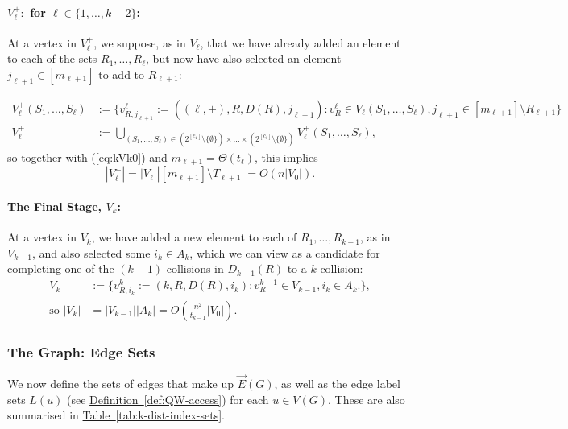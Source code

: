 \documentclass{theoretics}
\newcommand{\eq}[1]{\hyperref[eq:#1]{(\ref*{eq:#1})}}
\newcommand{\tabl}[1]{\hyperref[tab:#1]{Table~\ref*{tab:#1}}}
\newcommand{\defin}[1]{\hyperref[def:#1]{Definition~\ref*{def:#1}}}
\renewcommand{\>}{\rangle}
\newcommand{\<}{\langle}
\renewcommand{\(}{\left(}
\renewcommand{\)}{\right)}
\def\abs#1{\left| #1 \right|}
\begin{document}
\paragraph{$V_{\ell}^+:$ for $\ell\in\{1,\dots,k-2\}$:} At a vertex in $V_{\ell}^+$, we suppose, as in $V_{\ell}$, that we have already added an element to each of the sets $R_1,\dots,R_{\ell}$, but now have also selected an element $j_{\ell+1}\in [m_{\ell+1}]$ to add to $R_{\ell+1}$:

\begin{align*}
	V_{\ell}^+(S_1,\dots,S_{\ell})&:=\Big\{v^{\ell}_{R,j_{\ell+1}}:=((\ell,+),R,D(R),j_{\ell+1}): 
	 v^{\ell}_{R} \in V_{\ell}(S_1,\dots,S_{\ell}), j_{\ell+1}\in [m_{\ell+1}]\setminus R_{\ell+1}\Big\}\\
V_{\ell}^+ &:= \bigcup_{(S_1,\dots,S_{\ell})\in (2^{[c_1]}\setminus\{\emptyset\})\times\dots\times(2^{[c_\ell]}\setminus\{\emptyset\})} V_{\ell}^+(S_1,\dots,S_{\ell}),
\end{align*}
\noindent so together with \eq{kVk0} and $m_{\ell+1}=\Theta(t_{\ell})$, this implies
\begin{equation}
	\abs{V_{\ell}^+} = \abs{V_{\ell}}\abs{[m_{\ell+1}]\setminus T_{\ell+1}} = O\left(n\abs{V_0}\right).\label{eq:kVk1}
\end{equation}


\paragraph{The Final Stage, $V_k$:} At a vertex in $V_k$, we have added a new element to each of $R_1,\dots,R_{k-1}$, as in $V_{k-1}$, and also selected some $i_k\in A_k$, which we can view as a candidate for completing one of the $(k-1)$-collisions in $D_{k-1}(R)$ to a $k$-collision:
\begin{equation}
\begin{split}
	V_k&:=\big\{v^{k}_{R,i_k}:=(k,R,D(R),i_k): 
	v^{k-1}_{R} \in V_{k-1}, i_k\in A_k.\big\},\\
\mbox{so }
	\abs{V_k} &= \abs{V_{k-1}}\abs{A_k} = O\left(\frac{n^2}{t_{k-1}}\abs{V_0}\right).
\end{split}\label{eq:kVk}
\end{equation}


\subsubsection{The Graph: Edge Sets}\label{sec:k-dist-G-edges}


We now define the sets of edges that make up $\overrightarrow{E}(G)$, as well as the edge label sets $L(u)$ (see \defin{QW-access}) for each $u\in V(G)$. These are also summarised in \tabl{k-dist-index-sets}.
\end{document}
